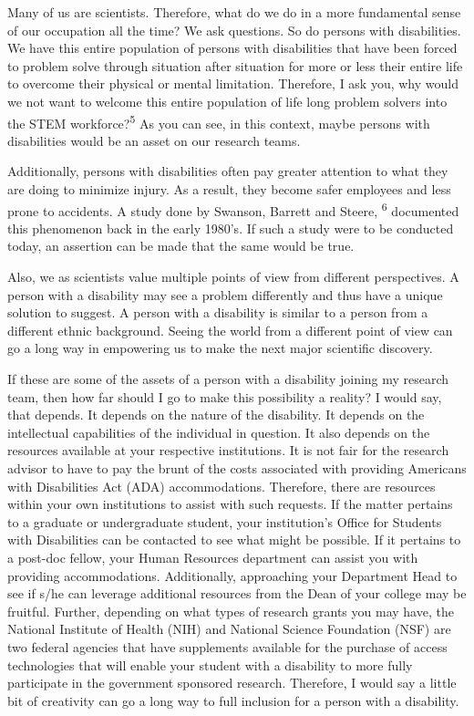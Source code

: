 \documentclass[11.5pt]{sig-alternate} %
\begin{document}
\begin{large}
Many of us are scientists. Therefore, what do we do in a more fundamental sense of our occupation all the time? We ask questions. So do persons with disabilities. We have this entire population of persons with disabilities that have been forced to problem solve through situation after situation for more or less their entire life to overcome their physical or mental limitation. Therefore, I ask you, why would we not want to welcome this entire population of life long problem solvers into the STEM workforce?\textsuperscript{5}  As you can see, in this context, maybe persons with disabilities would be an asset on our research teams. 

Additionally, persons with disabilities often pay greater attention to what they are doing to minimize injury. As a result, they become safer employees and less prone to accidents. A study done by Swanson, Barrett and Steere, \textsuperscript{6} documented this phenomenon back in the early 1980’s. If such a study were to be conducted today, an assertion can be made that the same would be true. 

Also, we as scientists value multiple points of view from different perspectives. A person with a disability may see a problem differently and thus have a unique solution to suggest. A person with a disability is similar to a person from a different ethnic background. Seeing the world from a different point of view can go a long way in empowering us to make the next major scientific discovery.

If these are some of the assets of a person with a disability joining my research team, then how far should I go to make this possibility a reality? I would say, that depends. It depends on the nature of the disability. It depends on the intellectual capabilities of the individual in question. It also depends on the resources available at your respective institutions. It is not fair for the research advisor to have to pay the brunt of the costs associated with providing Americans with Disabilities Act (ADA) accommodations.  Therefore, there are resources within your own institutions to assist with such requests. If the matter pertains to a graduate or undergraduate student, your institution’s Office for Students with Disabilities can be contacted to see what might be possible. If it pertains to a post-doc fellow, your Human Resources department can assist you with providing accommodations. Additionally, approaching your Department Head to see if s/he can leverage additional resources from the Dean of your college may be fruitful. Further, depending on what types of research grants you may have, the National Institute of Health (NIH) and National Science Foundation (NSF) are two federal agencies that have supplements available for the purchase of access technologies that will enable your student with a disability to more fully participate in the government sponsored research. Therefore, I would say a little bit of creativity can go a long way to full inclusion for a person with a disability.


\end{large}
\end{document}
